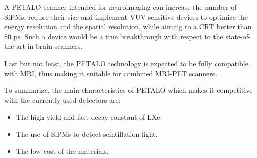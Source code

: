 \documentclass[review]{elsarticle}
\begin{document}
A PETALO scanner intended for neuroimaging can increase the number of SiPMs, reduce their size and implement VUV sensitive devices to optimize the energy resolution and the spatial resolution, while aiming to a  CRT  better than 80 ps. Such a device would be a true breakthrough with respect to the state-of-the-art in brain scanners. 

Last but not least, the PETALO technology is expected to be fully compatible with MRI, thus making it suitable for combined MRI-PET scanners. 

To summarize, the main characteristics of PETALO which makes it competitive with the currently used detectors are:

\begin{itemize}
\item The high yield and fast decay constant of LXe.
\item The use of SiPMs to detect scintillation light.
\item The low cost of the materials.
\end{itemize}



\section*{}


\end{document}
